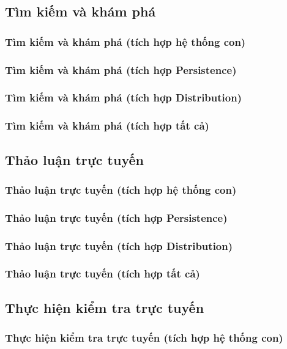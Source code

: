 \documentclass[./../main.tex]{subfiles}
\begin{document}
\subsection{Tìm kiếm và khám phá}
\subsubsection{Tìm kiếm và khám phá (tích hợp hệ thống con)}
\subsubsection{Tìm kiếm và khám phá (tích hợp Persistence)}
\subsubsection{Tìm kiếm và khám phá (tích hợp Distribution)}
\subsubsection{Tìm kiếm và khám phá (tích hợp tất cả)}

\subsection{Thảo luận trực tuyến}
\subsubsection{Thảo luận trực tuyến (tích hợp hệ thống con)}
\subsubsection{Thảo luận trực tuyến (tích hợp Persistence)}
\subsubsection{Thảo luận trực tuyến (tích hợp Distribution)}
\subsubsection{Thảo luận trực tuyến (tích hợp tất cả)}

\subsection{Thực hiện kiểm tra trực tuyến}
\subsubsection{Thực hiện kiểm tra trực tuyến (tích hợp hệ thống con)}
\end{document}

